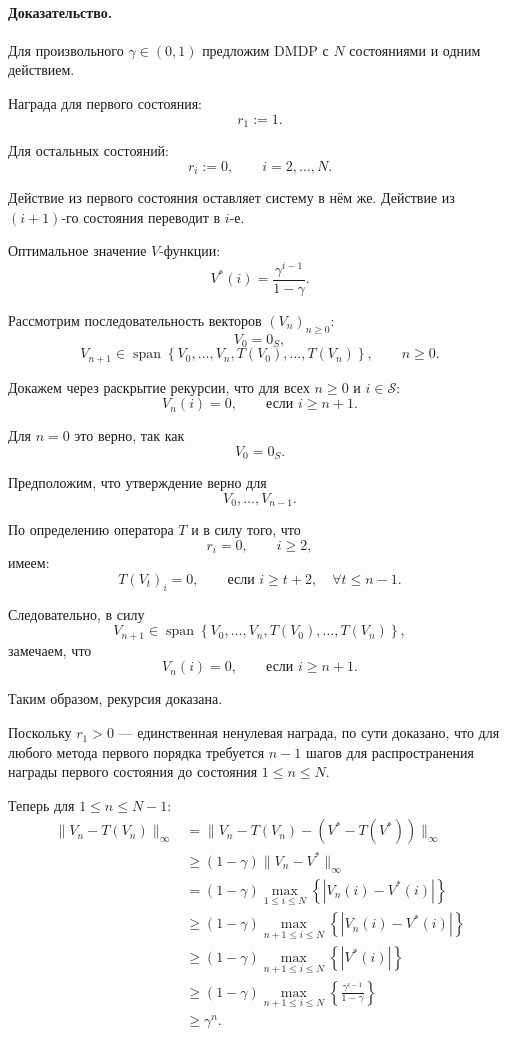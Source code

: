 \documentclass[12pt,a4paper]{article}
\begin{document}
\paragraph{Доказательство.}

Для произвольного $\gamma \in (0,1)$ предложим DMDP с $N$ состояниями и одним действием.

Награда для первого состояния:
\[
r_1 := 1.
\]

Для остальных состояний:
\[
r_i := 0,
\qquad
i=2,\ldots,N.
\]

Действие из первого состояния оставляет систему в нём же. Действие из $(i+1)$-го состояния переводит в $i$-е.

Оптимальное значение $V$-функции:
\[
V^\ast(i)
=
\frac{\gamma^{i-1}}{1-\gamma}.
\]

Рассмотрим последовательность векторов $(V_n)_{n \ge 0}$:
\[
V_0 = 0_S,
\]
\[
V_{n+1}
\in
\operatorname{span}
\left\{
V_0,\ldots,V_n,T(V_0),\ldots,T(V_n)
\right\},
\qquad
n \ge 0.
\]

Докажем через раскрытие рекурсии, что для всех $n \ge 0$ и $i \in \mathcal S$:
\[
V_n(i)=0,
\qquad
\text{если } i \ge n+1.
\]

Для $n=0$ это верно, так как
\[
V_0=0_S.
\]

Предположим, что утверждение верно для
\[
V_0,\ldots,V_{n-1}.
\]

По определению оператора $T$ и в силу того, что
\[
r_i=0,\qquad i \ge 2,
\]
имеем:
\[
T(V_t)_i = 0,
\qquad
\text{если } i \ge t+2,\quad \forall t \le n-1.
\]

Следовательно, в силу
\[
V_{n+1}
\in
\operatorname{span}
\left\{
V_0,\ldots,V_n,T(V_0),\ldots,T(V_n)
\right\},
\]
замечаем, что
\[
V_n(i)=0,
\qquad
\text{если } i \ge n+1.
\]

Таким образом, рекурсия доказана.

Поскольку $r_1>0$ --- единственная ненулевая награда, по сути доказано, что для любого метода первого порядка требуется $n-1$ шагов для распространения награды первого состояния до состояния $1 \le n \le N$.

Теперь для $1 \le n \le N-1$:
\begin{align}
\|V_n - T(V_n)\|_\infty
&=
\|V_n - T(V_n) - (V^\ast - T(V^\ast))\|_\infty
\tag{3}
\\
&\ge
(1-\gamma)\|V_n - V^\ast\|_\infty
\tag{4}
\\
&=
(1-\gamma)
\max_{1 \le i \le N}
\left\{
|V_n(i)-V^\ast(i)|
\right\}
\nonumber
\\
&\ge
(1-\gamma)
\max_{n+1 \le i \le N}
\left\{
|V_n(i)-V^\ast(i)|
\right\}
\nonumber
\\
&\ge
(1-\gamma)
\max_{n+1 \le i \le N}
\left\{
|V^\ast(i)|
\right\}
\tag{5}
\\
&\ge
(1-\gamma)
\max_{n+1 \le i \le N}
\left\{
\frac{\gamma^{i-1}}{1-\gamma}
\right\}
\nonumber
\\
&\ge
\gamma^n.
\nonumber
\end{align}
\end{document}
